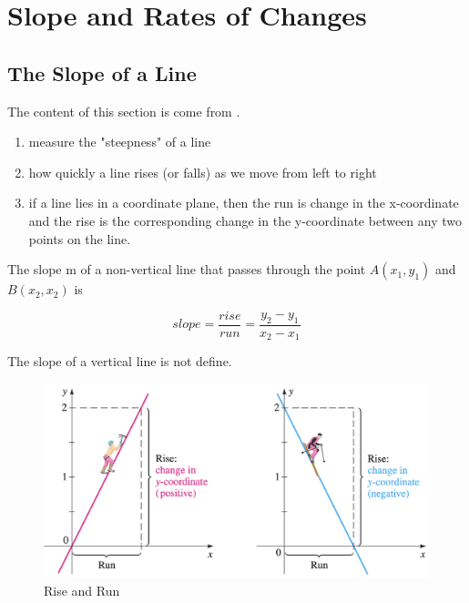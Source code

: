 \chapter{Slope and Rates of Changes}

\section{The Slope of a Line}
The content of this section is come from \cite{precalculus}.
\begin{enumerate}
    \item measure the "steepness" of a line
    \item how quickly a line rises (or falls) as we move from left to right
    \item if a line lies in a coordinate plane, then the run is change in the x-coordinate and the rise is the corresponding change in the y-coordinate between any two points on the line.
\end{enumerate}

\begin{theorem}
The slope m of a non-vertical line that passes through the point $A(x_1, y_1)$ and $B(x_2, x_2)$ is 

\begin{equation}
\label{eq:1}
slope = \frac{rise}{run}=\frac{y_2 - y_1}{x_2 - x_1}
\end{equation}

\begin{flushleft}
The slope of a vertical line is not define.
\end{flushleft}

\end{theorem}

\begin{figure}[h]
    \centering
    \includegraphics[scale=0.3]{chapter001/figures/fig001}
    \caption{Rise and Run}
    \label{fig:Fig1}
\end{figure}

